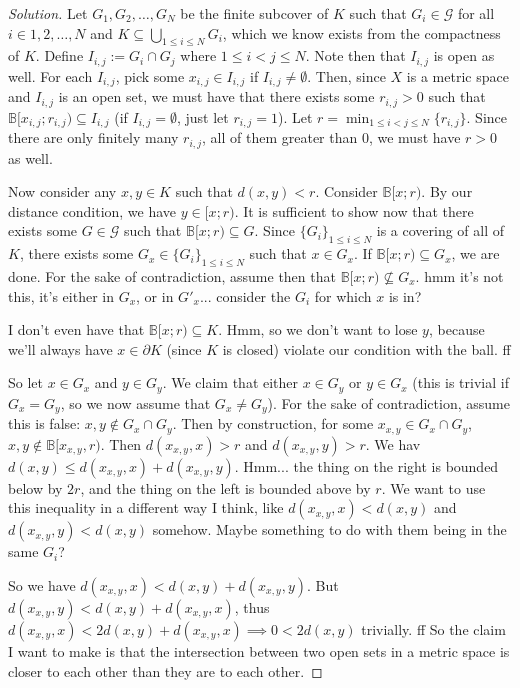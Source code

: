 \documentclass{article}
\begin{document}
\begin{proof}[Solution]\let\qed\relax
	Let $G_1, G_2, \dots, G_N$ be the finite subcover of $K$
	such that $G_i \in \mathcal{G}$ for all $i \in 1,2,\dots,N$
	and $K \subseteq \bigcup_{1\leq i \leq N}G_i$,
	which we know exists from the compactness of $K$.
	Define $I_{i,j} := G_i \cap G_j$ where $1 \leq i < j \leq N$.
	Note then that $I_{i,j}$ is open as well.
	For each $I_{i,j}$, pick some $x_{i,j} \in I_{i,j}$ if $I_{i,j} \neq \emptyset$.
	Then, since $X$ is a metric space and $I_{i,j}$ is an open set,
	we must have that there exists some $r_{i,j} > 0$
	such that $\mathbb{B}[x_{i,j};r_{i,j}) \subseteq I_{i,j}$
	(if $I_{i,j} = \emptyset$, just let $r_{i,j} = 1$).
	Let $r = \min_{1\leq i<j\leq N}\{r_{i,j}\}$.
	Since there are only finitely many $r_{i,j}$, all of them greater than $0$,
	we must have $r > 0$ as well.
	
	Now consider any $x,y \in K$ such that $d(x,y) < r$.
	Consider $\mathbb{B}[x;r)$.
	By our distance condition, we have $y \in \mathbb[x;r)$.
	It is sufficient to show now that there exists some $G \in \mathcal{G}$
	such that $\mathbb{B}[x;r) \subseteq G$.
	Since $\{G_i\}_{1\leq i\leq N}$ is a covering of all of $K$,
	there exists some $G_x \in \{G_i\}_{1\leq i\leq N}$ such that $x \in G_x$.
	If $\mathbb{B}[x;r) \subseteq G_x$, we are done.
	For the sake of contradiction, assume then that $\mathbb{B}[x;r) \not\subseteq G_x$.
	hmm it's not this, it's either in $G_x$, or in $G'_x$...
	consider the $G_i$ for which $x$ is in?

	I don't even have that $\mathbb{B}[x;r) \subseteq K$.
	Hmm, so we don't want to lose $y$, because we'll always have
	$x \in \partial K$ (since $K$ is closed) violate our condition with the ball.
	ff

	So let $x \in G_x$ and $y \in G_y$.
	We claim that either $x \in G_y$ or $y \in G_x$
	(this is trivial if $G_x = G_y$, so we now assume that $G_x \neq G_y$).
	For the sake of contradiction, assume this is false:
	$x, y \not\in G_x \cap G_y$.
	Then by construction, for some $x_{x,y} \in G_x \cap G_y$,
	$x,y \not\in \mathbb{B}[x_{x,y},r)$.
	Then $d(x_{x,y},x) > r$ and $d(x_{x,y},y) > r$.
	We hav $d(x,y) \leq d(x_{x,y},x) + d(x_{x,y},y)$.
	Hmm... the thing on the right is bounded below by $2r$,
	and the thing on the left is bounded above by $r$.
	We want to use this inequality in a different way I think,
	like $d(x_{x,y},x) < d(x,y)$ and $d(x_{x,y},y) < d(x,y)$ somehow.
	Maybe something to do with them being in the same $G_i$?

	So we have $d(x_{x,y}, x) < d(x,y) + d(x_{x,y},y)$.
	But $d(x_{x,y},y) < d(x,y) + d(x_{x,y},x)$, thus
	$d(x_{x,y}, x) < 2d(x,y) + d(x_{x,y},x) \implies 0 < 2d(x,y)$ trivially.
	ff
	So the claim I want to make is that the intersection between
	two open sets in a metric space is closer to each other than
	they are to each other.



\end{proof}
\end{document}
